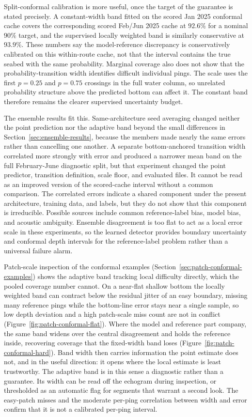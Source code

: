 Split-conformal calibration is more useful, once the target of the guarantee is stated precisely. A constant-width band fitted on the scored Jan 2025 conformal cache covers the corresponding scored Feb/\allowbreak Jun 2025 cache at $92.6\%$ for a nominal $90\%$ target, and the supervised locally weighted band is similarly conservative at $93.9\%$. These numbers say the model-reference discrepancy is conservatively calibrated on this within-route cache, not that the interval contains the true seabed with the same probability. Marginal coverage also does not show that the probability-transition width identifies difficult individual pings. The scale uses the first $p=0.25$ and $p=0.75$ crossings in the full water column, so unrelated probability structure above the predicted bottom can affect it. The constant band therefore remains the clearer supervised uncertainty budget.

The ensemble results fit this. Same-architecture seed averaging changed neither the point prediction nor the adaptive band beyond the small differences in Section~\ref{sec:ensemble-results}, because the members made nearly the same errors rather than cancelling one another. A separate bottom-anchored transition width correlated more strongly with error and produced a narrower mean band on the full February-June diagnostic split, but that experiment changed the point predictor, transition definition, scale floor, and evaluated files. It cannot be read as an improved version of the scored-cache interval without a common comparison. The correlated errors indicate a shared component under the present architecture, training data, and labels, but they do not show that this component is irreducible. Possible sources include common reference-label bias, model bias, and acoustic ambiguity. Ensemble disagreement is too flat to act as a local error scale in these experiments, so the learned detector provides boundary uncertainty and conformal depth intervals for the reference-label problem rather than a universal failure alarm.

Patch-scale inspection of the conformal examples (Section~\ref{sec:patch-conformal-examples}) shows the adaptive band tracking local difficulty directly, which the pooled coverage number cannot. On a near-flat shallow bottom the locally weighted band can contract below the residual jitter of an easy boundary, missing many reference pings while the bottom-line error stays near a single sample, so low depth deviation and a high patch-scale miss count are not in conflict (Figure~\ref{fig:patch-conformal-flat}). Where the model and reference part company, the same band widens over the central disagreement and holds the reference inside, recovering coverage that the fixed-width band loses (Figure~\ref{fig:patch-conformal-hard}). Band width then carries information the point estimate does not, and in the useful direction: it opens where the local estimate is least trustworthy. The adaptive band is in this sense a diagnostic rather than a guarantee. Its width can be read off the echogram during inspection, or thresholded as an automatic flag for segments that warrant a second look. The easy-patch misses and the moderate per-ping correlation between width and error confirm that it is not a calibrated per-ping interval.


